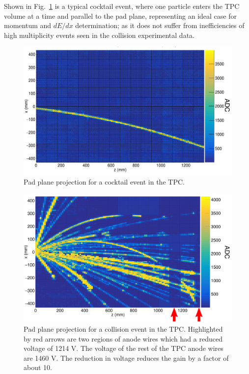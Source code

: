 \documentclass[review,number,sort&compress]{elsarticle}
\begin{document}
Shown in Fig.~\ref{fig:cocktail} is a typical cocktail event, where one particle enters the TPC volume at a time and parallel to the pad plane, representing an ideal case for momentum and $dE/dx$ determination; as it does not suffer from inefficiencies of high multiplicity events seen in the collision experimental data.  

\begin{figure}[ht!]
\includegraphics[width=\linewidth]{fig9}
\caption{Pad plane projection for a cocktail event in the TPC.}
\label{fig:cocktail}
\end{figure}

\begin{figure}[ht!]
\includegraphics[width=\linewidth]{fig10}
\caption{Pad plane projection for a collision event in the TPC. Highlighted by red arrows are two regions of anode wires which had a reduced voltage of 1214 V. The voltage of the rest of the TPC anode wires are 1460 V. The reduction in voltage reduces the gain by a factor of about 10. }
\label{fig:data}
\end{figure}
\end{document}
